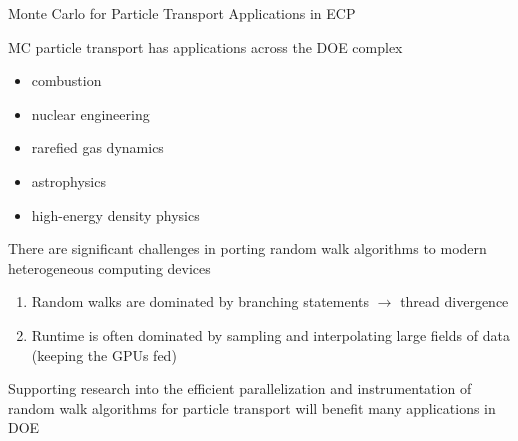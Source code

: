 \documentclass{beamer}
\begin{document}

\begin{frame}{Monte Carlo for Particle Transport Applications in ECP}

  MC particle transport has applications across the DOE complex
  \begin{itemize}
    \setlength{\itemsep}{-0.2\baselineskip}
  \item combustion
  \item nuclear engineering
  \item rarefied gas dynamics
  \item astrophysics
  \item high-energy density physics
  \end{itemize}

  \vfill

  There are significant challenges in porting random walk algorithms to modern
  heterogeneous computing devices
  \begin{enumerate}
    \setlength{\itemsep}{-0.2\baselineskip}
  \item Random walks are dominated by branching statements $\rightarrow$
    thread divergence
  \item Runtime is often dominated by sampling and interpolating large fields
    of data (keeping the GPUs fed)
  \end{enumerate}

  \vfill

  Supporting research into the efficient parallelization and instrumentation
  of random walk algorithms for particle transport will benefit many
  applications in DOE

\end{frame}

\end{document}
